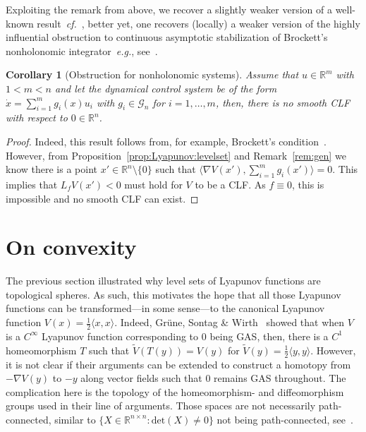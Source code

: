 \documentclass[letterpaper, 10 pt, conference]{ieeeconf}  %
\theoremstyle{mystyle}
\newtheorem{corollary}[theorem]{Corollary}
\begin{document}
Exploiting the remark from above, we recover a slightly weaker version of a well-known result~\textit{cf.}~\cite[Prop.~6.1.4]{ref:bloch}, better yet, one recovers (locally) a weaker version of the highly influential obstruction to continuous asymptotic stabilization of Brockett's nonholonomic integrator~\textit{e.g.}, see~\cite[Ex.~5.9.16]{ref:sontag2013mathematical}.

{
\begin{corollary}[Obstruction for nonholonomic systems]
Assume that $u\in \mathbb{R}^m$ with $1<m<n$ and let the dynamical control system be of the form $\dot{x}=\sum^m_{i=1}g_i(x) u_i$ with $g_i\in \mathscr{G}_n$ for $i=1,\dots,m$, then, there is no smooth CLF with respect to $0\in \mathbb{R}^n$.
\end{corollary}
\begin{proof}
Indeed, this result follows from, for example, Brockett's condition~\cite{ref:brockett1983asymptotic}. However, from Proposition~\ref{prop:Lyapunov:levelset} and Remark~\ref{rem:gen} we know there is a point $x'\in \mathbb{R}^n\setminus \{0\}$ such that $\langle \nabla V(x'),\sum^m_{i=1}g_i(x')\rangle =0$. This implies that $L_fV(x')<0$ must hold for $V$ to be a CLF. As $f \equiv 0$, this is impossible and no smooth CLF can exist. 
\end{proof}
}
\section{On convexity}
\label{sec:cvx}
The previous section illustrated why level sets of Lyapunov functions are topological spheres. As such, this motivates the hope that all those Lyapunov functions can be transformed---in some sense---to the canonical Lyapunov function $V(x)=\tfrac{1}{2}\langle x,x\rangle$. {Indeed, Gr\"une, Sontag \& Wirth~\cite{grune1999asymptotic} showed that when $V$ is a $C^{\infty}$ Lyapunov function corresponding to $0$ being GAS, then, there is a $C^1$ homeomorphism $T$ such that $\widetilde{V}(T(y))=V(y)$ for $\widetilde{V}(y)=\tfrac{1}{2}\langle y,y \rangle$. However, it is not clear if their arguments can be extended to construct a homotopy from $-\nabla V(y)$ to $-y$ along vector fields such that $0$ remains GAS throughout. The complication here is the topology of the homeomorphism- and diffeomorphism groups used in their line of arguments. Those spaces are not necessarily path-connected, similar to $\{X\in \mathbb{R}^{n\times n}:\mathrm{det}(X)\neq 0\}$ not being path-connected, see~\cite[Ch.~9]{kupers2019lectures}.} 
\end{document}
